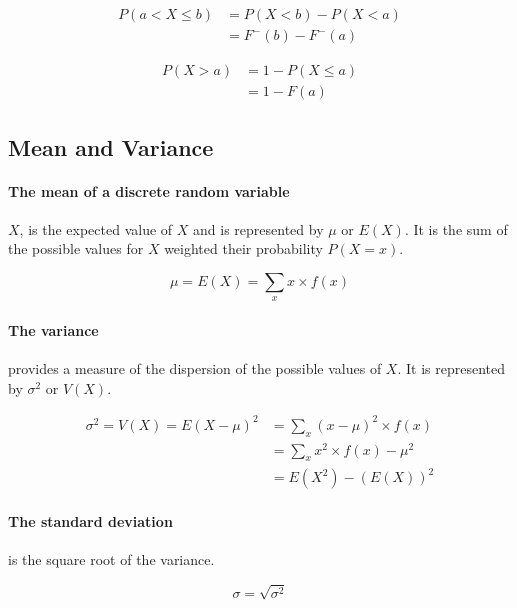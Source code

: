 \documentclass[a4paper, 10pt]{article}
\begin{document}
	\begin{align*}
		P(a < X \le b) &= P(X < b) - P(X < a) \\
		&= F^{-}(b) - F^{-}(a)
	\end{align*}

	\begin{align*}
		P(X > a) &= 1-P(X\leq a) \\
		&= 1-F(a)
	\end{align*}

	\subsection{Mean and Variance}

	\paragraph{The mean of a discrete random variable}

	\(X\), is the expected value of \(X\) and is represented by \(\mu\) or \(E(X)\). It is the sum of the possible values for \(X\) weighted their probability \(P(X=x)\).

	\begin{equation*}
		\mu = E(X) = \sum_{x}x\times f(x)
	\end{equation*}

	\paragraph{The variance}

	provides a measure of the dispersion of the possible values of \(X\). It is represented by \(\sigma ^2\) or \(V(X)\).

	\begin{align*}
		\sigma ^2 = V(X) = E(X-\mu)^2 &= \sum_{x}(x-\mu)^2\times f(x) \\
		&= \sum_{x}x^2\times f(x)-\mu ^2 \\
		&= E(X^2) - (E(X))^2
	\end{align*}

	\paragraph{The standard deviation}

	is the square root of the variance.

	\begin{equation*}
		\sigma = \sqrt{\sigma ^2}
	\end{equation*}
\end{document}
